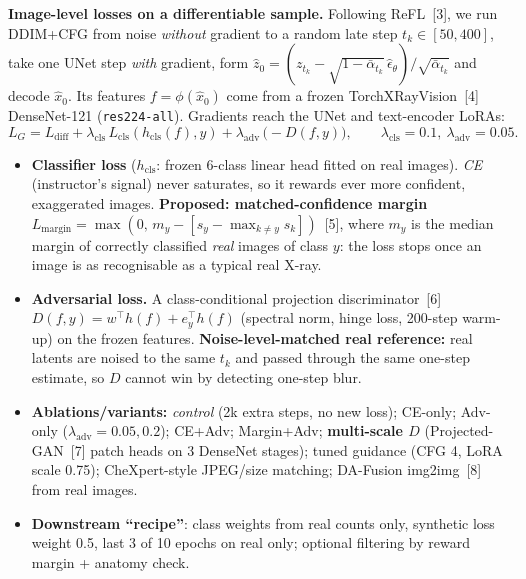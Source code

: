 \documentclass[10pt]{article}
\newcommand{\hx}{\hat{x}_0}
\newcommand{\sect}[1]{\vspace{2pt}{\large\bf #1}\par}
\begin{document}
\sect{2\quad Approaches tried}
\textbf{Image-level losses on a differentiable sample.} Following ReFL~[3], we run DDIM+CFG from noise \emph{without} gradient to a random late step $t_k\in[50,400]$, take one UNet step \emph{with} gradient, form $\hat z_0=(z_{t_k}-\sqrt{1-\bar\alpha_{t_k}}\,\hat\epsilon_\theta)/\sqrt{\bar\alpha_{t_k}}$ and decode $\hx$. Its features $f=\phi(\hx)$ come from a frozen TorchXRayVision~[4] DenseNet-121 (\texttt{res224-all}). Gradients reach the UNet and text-encoder LoRAs:
\begin{equation*}
L_G=L_{\text{diff}}+\lambda_{\text{cls}}\,L_{\text{cls}}(h_{\text{cls}}(f),y)+\lambda_{\text{adv}}\,\big(-D(f,y)\big),\qquad \lambda_{\text{cls}}=0.1,\ \lambda_{\text{adv}}=0.05 .
\end{equation*}
\begin{itemize}
\item \textbf{Classifier loss} ($h_{\text{cls}}$: frozen 6-class linear head fitted on real images). \emph{CE} (instructor's signal) never saturates, so it rewards ever more confident, exaggerated images. \textbf{Proposed: matched-confidence margin} $L_{\text{margin}}=\max(0,\,m_y-[s_y-\max_{k\neq y}s_k])$~[5], where $m_y$ is the median margin of correctly classified \emph{real} images of class $y$: the loss stops once an image is as recognisable as a typical real X-ray.
\item \textbf{Adversarial loss.} A class-conditional projection discriminator~[6] $D(f,y)=w^\top h(f)+e_y^\top h(f)$ (spectral norm, hinge loss, 200-step warm-up) on the frozen features. \textbf{Noise-level-matched real reference:} real latents are noised to the same $t_k$ and passed through the same one-step estimate, so $D$ cannot win by detecting one-step blur.
\item \textbf{Ablations/variants:} \emph{control} (2k extra steps, no new loss); CE-only; Adv-only ($\lambda_{\text{adv}}{=}0.05, 0.2$); CE+Adv; Margin+Adv; \textbf{multi-scale $D$} (Projected-GAN~[7] patch heads on 3 DenseNet stages); tuned guidance (CFG 4, LoRA scale 0.75); CheXpert-style JPEG/size matching; DA-Fusion img2img~[8] from real images.
\item \textbf{Downstream ``recipe''}: class weights from real counts only, synthetic loss weight 0.5, last 3 of 10 epochs on real only; optional filtering by reward margin + anatomy check.
\end{itemize}
\end{document}
